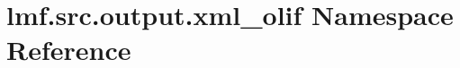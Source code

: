 \hypertarget{namespacelmf_1_1src_1_1output_1_1xml__olif}{\section{lmf.\+src.\+output.\+xml\+\_\+olif Namespace Reference}
\label{namespacelmf_1_1src_1_1output_1_1xml__olif}
}
